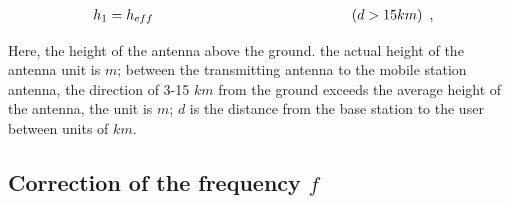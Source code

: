 \documentclass[12pt,a4paper,twocolumn,fleqn]{narms}
\begin{document}
\begin{equation}
\begin{array}{l}
{h_1} = {h_{eff}}{\kern 1pt} {\kern 1pt} {\kern 1pt} {\kern 1pt} {\kern 1pt} {\kern 1pt} {\kern 1pt} {\kern 1pt} {\kern 1pt} {\kern 1pt} {\kern 1pt} {\kern 1pt} {\kern 1pt} {\kern 1pt} {\kern 1pt} {\kern 1pt} {\kern 1pt} {\kern 1pt} {\kern 1pt} {\kern 1pt} {\kern 1pt} {\kern 1pt} {\kern 1pt} {\kern 1pt} {\kern 1pt} {\kern 1pt} {\kern 1pt} {\kern 1pt} {\kern 1pt} {\kern 1pt} {\kern 1pt} {\kern 1pt} {\kern 1pt} {\kern 1pt} {\kern 1pt} {\kern 1pt} {\kern 1pt} {\kern 1pt} {\kern 1pt} {\kern 1pt} {\kern 1pt} {\kern 1pt} {\kern 1pt} {\kern 1pt} {\kern 1pt} {\kern 1pt} {\kern 1pt} {\kern 1pt} {\kern 1pt} {\kern 1pt} {\kern 1pt} {\kern 1pt} {\kern 1pt} {\kern 1pt} {\kern 1pt} {\kern 1pt} {\kern 1pt} {\kern 1pt} {\kern 1pt} {\kern 1pt} {\kern 1pt} {\kern 1pt} {\kern 1pt} {\kern 1pt} {\kern 1pt} {\kern 1pt} {\kern 1pt} {\kern 1pt} {\kern 1pt} {\kern 1pt} {\kern 1pt} {\kern 1pt} {\kern 1pt} {\kern 1pt} {\kern 1pt} {\kern 1pt} {\kern 1pt} {\kern 1pt} {\kern 1pt} {\kern 1pt} {\kern 1pt} {\kern 1pt} {\kern 1pt} {\kern 1pt} {\kern 1pt} {\kern 1pt} {\kern 1pt} {\kern 1pt} {\kern 1pt} {\kern 1pt} {\kern 1pt} {\kern 1pt} {\kern 1pt} {\kern 1pt} {\kern 1pt} {\kern 1pt} {\kern 1pt} {\kern 1pt} {\kern 1pt} {\kern 1pt} {\kern 1pt} {\kern 1pt} {\kern 1pt} {\kern 1pt} {\kern 1pt} {\kern 1pt} {\kern 1pt} {\kern 1pt} {\kern 1pt} {\kern 1pt} {\kern 1pt} {\kern 1pt} {\kern 1pt} {\kern 1pt} {\kern 1pt} {\kern 1pt} {\kern 1pt} {\kern 1pt} {\kern 1pt} {\kern 1pt} {\kern 1pt} {\kern 1pt} {\kern 1pt} {\kern 1pt} {\kern 1pt} {\kern 1pt} {\kern 1pt} {\kern 1pt} {\kern 1pt} {\kern 1pt} {\kern 1pt} {\kern 1pt} {\kern 1pt} {\kern 1pt} {\kern 1pt} {\kern 1pt} {\kern 1pt} {\kern 1pt} {\kern 1pt} {\kern 1pt} {\kern 1pt} {\kern 1pt} (d > 15km)
\end{array}, 

\label{keurough} \end{equation} 

Here, the height of the antenna above the ground. the actual height of the antenna unit is $m$; between the transmitting antenna to the mobile station antenna, the direction of 3-15 $km$ from the ground exceeds the average height of the antenna, the unit is $m$; $d$ is the distance from the base station to the user between units of $km$.

\subsection{Correction of the frequency $f$}
\end{document}

